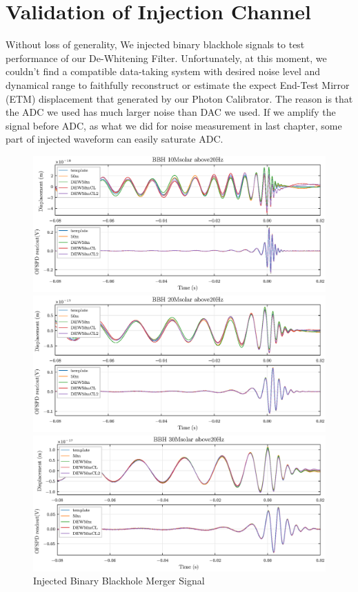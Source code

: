 




\chapter{Validation of Injection Channel}

Without loss of generality, We injected binary blackhole signals to test performance of our De-Whitening Filter. Unfortunately, at this moment, we couldn't find a compatible data-taking system with desired noise level and dynamical range to faithfully reconstruct or estimate the expect End-Test Mirror (ETM) displacement that generated by our Photon Calibrator. The reason is that the ADC we used has much larger noise than DAC we used. If we amplify the signal before ADC, as what we did for noise measurement in last chapter, some part of injected waveform can easily saturate ADC.

 


  

\begin{figure}[hbt!]
\centering
\includegraphics[width=\textwidth]{figure/inj/10.eps}


\includegraphics[width=\textwidth]{figure/inj/20.eps}


\includegraphics[width=\textwidth]{figure/inj/30.eps}
\caption{Injected Binary Blackhole Merger Signal}\label{fig:bbhinj}
\end{figure}



